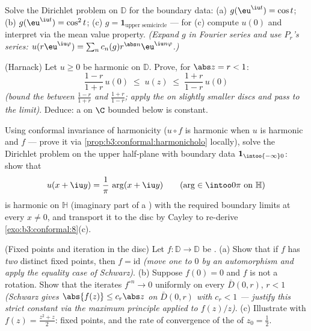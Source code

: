 \begin{exercise}[$\star\star$]\label{exo:b3:conformal:8}
Solve the Dirichlet problem on $\mathbb D$ for the boundary
data: (a) $g(\eu^{\iu t}) = \cos t$; (b) $g(\eu^{\iu t}) =
\cos^2 t$; (c) $g = \mathbf 1_{\text{upper semicircle}}$ ---
for (c) compute $u(0)$ and interpret via the mean value
property. \emph{(Expand $g$ in Fourier series and use
$P_r$'s series: $u(r\eu^{\iu\varphi}) = \sum_n c_n(g)
r^{\abs n}\eu^{\iu n\varphi}$.)}
\end{exercise}

\begin{exercise}[$\star\star\star$]\label{exo:b3:conformal:9}
(Harnack) Let $u \geq 0$ be harmonic on $\mathbb D$. Prove,
for $\abs z = r < 1$:
\[
\frac{1 - r}{1 + r}\,u(0) \;\leq\; u(z) \;\leq\;
\frac{1 + r}{1 - r}\,u(0)
\]
\emph{(bound the  between $\frac{1-r}{1+r}$ and
$\frac{1+r}{1-r}$; apply the  on slightly
smaller discs and pass to the limit)}. Deduce: a  on $\C$ bounded below is constant.
\end{exercise}

\begin{exercise}[$\star\star$]\label{exo:b3:conformal:10}
Using conformal invariance of harmonicity ($u\circ f$ is
harmonic when $u$ is harmonic and $f$  --- prove
it via \cref{prop:b3:conformal:harmonicholo} locally), solve
the Dirichlet problem on the upper half-plane with boundary
data $\mathbf 1_{\intoo{-\infty}0}$: show that
\[
u(x + \iu y) = \frac1\pi\,\arg(x + \iu y)
\qquad (\arg \in \intoo0\pi \text{ on } \mathbb H)
\]
is harmonic on $\mathbb H$ (imaginary part of a ) with the required boundary limits at every $x \neq
0$, and transport it to the disc by Cayley to re-derive
\cref{exo:b3:conformal:8}(c).
\end{exercise}

\begin{exercise}[$\star\star$]\label{exo:b3:conformal:11}
(Fixed points and iteration in the disc) Let $f\colon\mathbb
D \to \mathbb D$ be .
(a) Show that if $f$ has \emph{two} distinct fixed points,
then $f = \mathrm{id}$ \emph{(move one to $0$ by an
automorphism and apply the equality case of Schwarz)}.
(b) Suppose $f(0) = 0$ and $f$ is not a rotation. Show that
the iterates $f^{\circ n} \to 0$ uniformly on every 
$\bar D(0, r)$, $r < 1$ \emph{(Schwarz gives $\abs{f(z)}
\leq c_r\abs z$ on $\bar D(0,r)$ with $c_r < 1$ --- justify
this strict constant via the maximum principle applied to
$f(z)/z$)}.
(c) Illustrate with $f(z) = \frac{z^2 + z}2$: fixed points,
and the rate of convergence of the  of $z_0 =
\frac12$.
\end{exercise}

